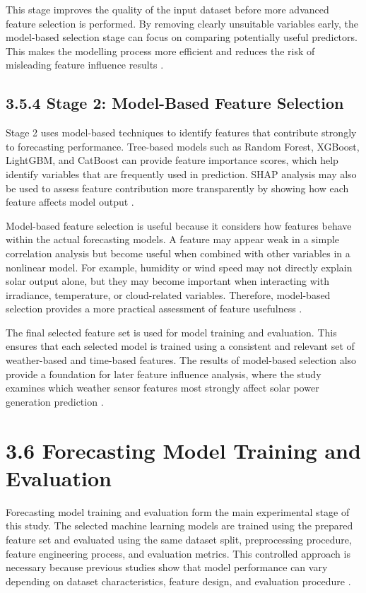 This stage improves the quality of the input dataset before more advanced feature selection is performed. By removing clearly unsuitable variables early, the model-based selection stage can focus on comparing potentially useful predictors. This makes the modelling process more efficient and reduces the risk of misleading feature influence results \parencite{Bakht2025, Alhassan2025, Ma2025}.

\subsection{3.5.4 Stage 2: Model-Based Feature Selection}

Stage 2 uses model-based techniques to identify features that contribute strongly to forecasting performance. Tree-based models such as Random Forest, XGBoost, LightGBM, and CatBoost can provide feature importance scores, which help identify variables that are frequently used in prediction. SHAP analysis may also be used to assess feature contribution more transparently by showing how each feature affects model output \parencite{JnanaVarshitha2025, Bakht2025, Pongphaw2025}.

Model-based feature selection is useful because it considers how features behave within the actual forecasting models. A feature may appear weak in a simple correlation analysis but become useful when combined with other variables in a nonlinear model. For example, humidity or wind speed may not directly explain solar output alone, but they may become important when interacting with irradiance, temperature, or cloud-related variables. Therefore, model-based selection provides a more practical assessment of feature usefulness \parencite{TsaiLo2025, CarvalhoJunior2025, Eren2025}.

The final selected feature set is used for model training and evaluation. This ensures that each selected model is trained using a consistent and relevant set of weather-based and time-based features. The results of model-based selection also provide a foundation for later feature influence analysis, where the study examines which weather sensor features most strongly affect solar power generation prediction \parencite{Duvuru2026, Ma2025, Alhassan2025}.

\section{3.6 Forecasting Model Training and Evaluation}

Forecasting model training and evaluation form the main experimental stage of this study. The selected machine learning models are trained using the prepared feature set and evaluated using the same dataset split, preprocessing procedure, feature engineering process, and evaluation metrics. This controlled approach is necessary because previous studies show that model performance can vary depending on dataset characteristics, feature design, and evaluation procedure \parencite{JnanaVarshitha2025, ArellanosTafur2025, Alhassan2025}.

